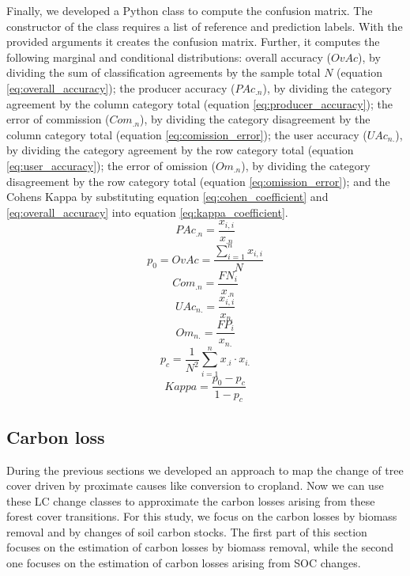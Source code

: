 			Finally, we developed a Python class to compute the confusion matrix. The constructor of the class requires a list of reference and prediction labels. With the provided arguments it creates the confusion matrix. Further, it computes the following marginal and conditional distributions: overall accuracy ($OvAc$), by dividing the sum of classification agreements by the sample total $N$ (equation \ref{eq:overall_accuracy}); the producer accuracy ($PAc_{.n}$), by dividing the category agreement by the column category total (equation \ref{eq:producer_accuracy}); the error of commission ($Com_{.n}$), by dividing the category disagreement by the column category total (equation \ref{eq:comission_error}); the user accuracy ($UAc_{n.}$), by dividing the category agreement by the row category total (equation \ref{eq:user_accuracy}); the error of omission ($Om_{.n}$), by dividing the category disagreement by the row category total (equation \ref{eq:omission_error}); and the Cohens Kappa by substituting equation \ref{eq:cohen_coefficient} and \ref{eq:overall_accuracy} into equation \ref{eq:kappa_coefficient}.
			\begin{equation}
			\label{eq:producer_accuracy}
				PAc_{.n} = \frac{x_{i,i}}{x_{.n}}
			\end{equation}
			\begin{equation}
			\label{eq:overall_accuracy}
				p_0=OvAc = \frac{\displaystyle\sum_{i=1}^{n}x_{i,i}}{N}
			\end{equation}
			\begin{equation}
			\label{eq:comission_error}
				Com_{.n} = \frac{FN_i}{x_{.n}}
			\end{equation}
			\begin{equation}
			\label{eq:user_accuracy}
				UAc_{n.} = \frac{x_{i,i}}{x_{n.}}
			\end{equation}
			\begin{equation}
			\label{eq:omission_error}
				Om_{n.} = \frac{FP_i}{x_{n.}}
			\end{equation}
			\begin{equation}
			\label{eq:cohen_coefficient}
				p_c = \frac{1}{N^2}\displaystyle\sum_{i=1}^{n} x_{.i} \cdot x_{i.}
			\end{equation}
			\begin{equation}
			\label{eq:kappa_coefficient}
				Kappa = \frac{p_0-p_c}{1-p_c}
			\end{equation}

	\subsection{Carbon loss}
		During the previous sections we developed an approach to map the change of tree cover driven by proximate causes like conversion to cropland. Now we can use these \ac{LC} change classes to approximate the carbon losses arising from these forest cover transitions. For this study, we focus on the carbon losses by biomass removal and by changes of soil carbon stocks. The first part of this section focuses on the estimation of carbon losses by biomass removal, while the second one focuses on the estimation of carbon losses arising from \ac{SOC} changes. 

